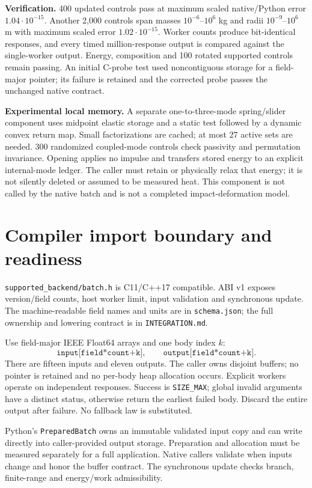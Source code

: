 \documentclass[10pt,a4paper]{article}
\begin{document}
\textbf{Verification.} 400 updated controls pass at maximum scaled native/Python
error $1.04\cdot10^{-15}$. Another 2,000 controls span masses $10^{-6}$--$10^6$ kg
and radii $10^{-9}$--$10^6$ m with maximum scaled error $1.02\cdot10^{-15}$.
Worker counts produce bit-identical responses, and every timed million-response
output is compared against the single-worker output. Energy, composition and
100 rotated supported controls remain passing. An initial C-probe test used
noncontiguous storage for a field-major pointer; its failure is retained and the
corrected probe passes the unchanged native contract.

\textbf{Experimental local memory.} A separate one-to-three-mode spring/slider
component uses midpoint elastic storage and a static test followed by a dynamic
convex return map. Small factorizations are cached; at most 27 active sets are
needed. 300 randomized coupled-mode controls check passivity and permutation
invariance. Opening applies no impulse and transfers stored energy to an explicit
internal-mode ledger. The caller must retain or physically relax that energy;
it is not silently deleted or assumed to be measured heat. This component is
not called by the native batch and is not a completed impact-deformation model.
\newpage
\section*{Compiler import boundary and readiness}
\texttt{supported\_backend/batch.h} is C11/C++17 compatible. ABI v1 exposes
version/field counts, host worker limit, input validation and synchronous update.
The machine-readable field names and units are in \texttt{schema.json}; the full
ownership and lowering contract is in \texttt{INTEGRATION.md}.

Use field-major IEEE Float64 arrays and one body index $k$:
\[
\texttt{input[field*count+k]},\qquad\texttt{output[field*count+k]}.
\]
There are fifteen inputs and eleven outputs. The caller owns disjoint buffers;
no pointer is retained and no per-body heap allocation occurs. Explicit workers
operate on independent responses. Success is \texttt{SIZE\_MAX}; global invalid
arguments have a distinct status, otherwise return the earliest failed body.
Discard the entire output after failure. No fallback law is substituted.

Python's \texttt{PreparedBatch} owns an immutable validated input copy and can
write directly into caller-provided output storage. Preparation and allocation
must be measured separately for a full application. Native callers validate when
inputs change and honor the buffer contract. The synchronous update checks
branch, finite-range and energy/work admissibility.
\end{document}
